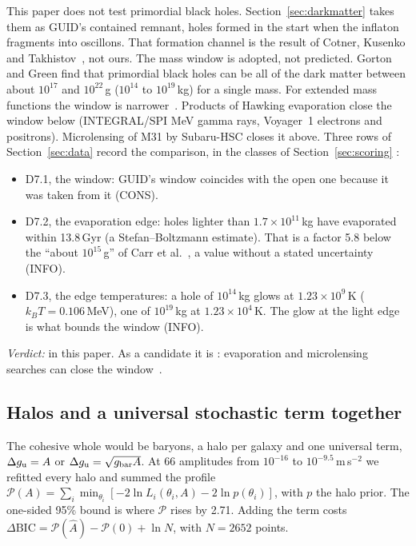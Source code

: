 This paper does not test primordial black holes. Section~\ref{sec:darkmatter} takes them as GUID's contained remnant, holes formed in the
start when the inflaton fragments into oscillons. That formation channel is the result of Cotner, Kusenko and Takhistov~\cite{cotner}, not
ours. The mass window is adopted, not predicted. Gorton and Green find that primordial black holes can be all of the dark matter between
about $10^{17}$ and $10^{22}$\,g ($10^{14}$ to $10^{19}$\,kg) for a single mass. For extended mass functions the window is
narrower~\cite{gortongreen}. Products of Hawking evaporation close the window below (INTEGRAL/SPI MeV gamma rays, Voyager~1 electrons and
positrons). Microlensing of M31 by Subaru-HSC closes it above. Three rows of Section~\ref{sec:data} record the comparison, in the classes of
Section~\ref{sec:scoring} :
\begin{itemize}[nosep]
\item D7.1, the window: GUID's window coincides with the open one because it was taken from it (CONS).
\item D7.2, the evaporation edge: holes lighter than $1.7\times10^{11}$\,kg have evaporated within 13.8\,Gyr (a Stefan--Boltzmann estimate).
That is a factor 5.8 below the ``about $10^{15}$\,g'' of Carr et al.~\cite{carr2021}, a value without a stated uncertainty (INFO).
\item D7.3, the edge temperatures: a hole of $10^{14}$\,kg glows at $1.23\times10^9$\,K ($k_BT=0.106$\,MeV), one of $10^{19}$\,kg at
$1.23\times10^4$\,K. The glow at the light edge is what bounds the window (INFO).
\end{itemize}
\emph{Verdict:}  in this paper. As a candidate it is : evaporation and microlensing searches can close the
window~\cite{gortongreen}.

\subsection{Halos and a universal stochastic term together}\label{sec:remnant-joint}

The cohesive whole would be baryons, a halo per galaxy and one universal term, $\Delta g_{\rm u}=A$ or $\Delta g_{\rm u}=\sqrt{g_{\rm bar}A}$.
At 66 amplitudes from $10^{-16}$ to $10^{-9.5}$\,m\,s$^{-2}$ we refitted every halo and summed the profile
$\mathcal{P}(A)=\sum_i\min_{\theta_i}[-2\ln L_i(\theta_i,A)-2\ln p(\theta_i)]$, with $p$ the halo prior. The one-sided 95\% bound is where
$\mathcal{P}$ rises by 2.71. Adding the term costs $\Delta\mathrm{BIC}=\mathcal{P}(\hat A)-\mathcal{P}(0)+\ln N$, with $N=2652$ points.

